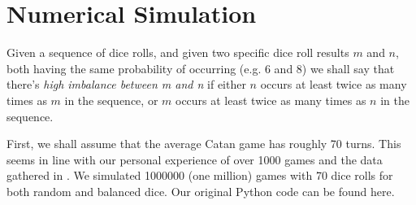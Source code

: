 \documentclass[11pt]{article}
\begin{document}




\section{Numerical Simulation}

Given a sequence of dice rolls, and given two specific dice roll results $m$ and $n$, both having the same probability of occurring (e.g. 6 and 8) we shall say that there's \emph{high imbalance between m and n} if either $n$ occurs at least twice as many times as $m$ in the sequence, or  $m$ occurs at least twice as many times as $n$ in the sequence.

First, we shall assume that the average Catan game has roughly 70 turns. This seems in line with our personal experience of over 1000 games and the data gathered in \cite{BGB}. We simulated 1000000 (one million) games with 70 dice rolls for both random and balanced dice. Our original Python code can be found here.
\end{document}
